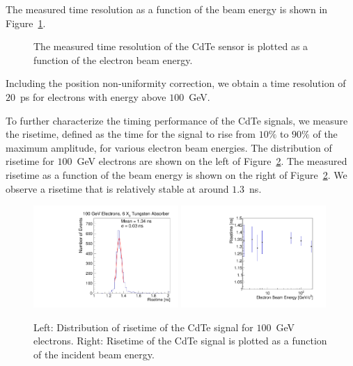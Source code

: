 \documentclass[preprint,1p]{elsarticle}
\begin{document}
The measured time resolution as a function of the beam energy is shown in
Figure~\ref{fig:ChargeVsEnergy}.

\begin{figure}[htbp] 
\centering
\caption{ The measured time resolution of the CdTe sensor is plotted as a function
of the electron beam energy. } 
\label{fig:ChargeVsEnergy} 
\end{figure} 

Including the position non-uniformity correction, we obtain a time resolution of $20$~ps
for electrons with energy above $100$~GeV. 


To further characterize the timing performance of the CdTe signals, we measure the
risetime, defined as the time for the signal to rise from $10\%$ to $90\%$ of the maximum
amplitude, for various electron beam energies. The distribution of risetime for
$100$~GeV electrons are shown on the left of Figure~\ref{fig:riseTime}. The 
measured risetime as a function of the beam energy is shown on the right of 
Figure~\ref{fig:riseTime}. We observe a risetime that is relatively stable
at around $1.3$~ns.

\begin{figure}[htbp] 
\centering
\includegraphics[width=0.49\textwidth]{figures/100GeV_risetime.pdf} 
\includegraphics[width=0.49\textwidth]{figures/RisetimeVsEnergy.pdf} 
\caption{ Left: Distribution of risetime of the CdTe signal for $100$~GeV electrons. 
Right: Risetime of the CdTe signal is plotted as a function of the incident beam energy. } 
\label{fig:riseTime} 
\end{figure} 
\end{document}
